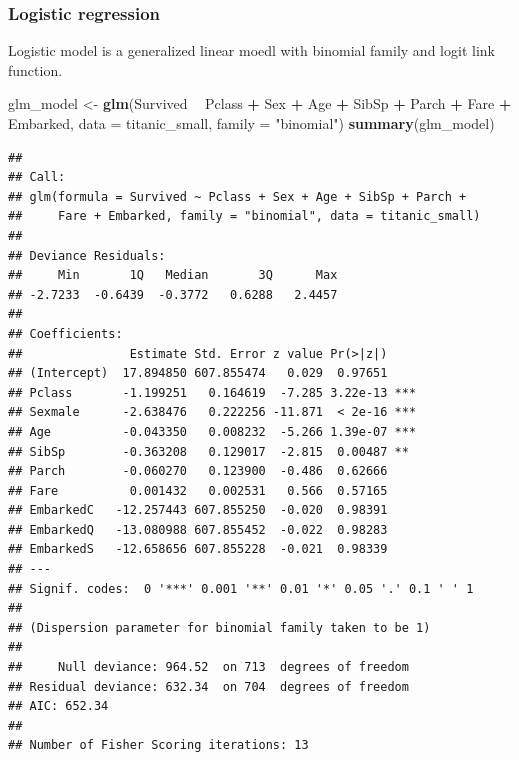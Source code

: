 \documentclass[]{krantz}
\newenvironment{Shaded}{\begin{snugshade}}{\end{snugshade}}
\newcommand{\DataTypeTok}[1]{\textcolor[rgb]{0.13,0.29,0.53}{#1}}
\newcommand{\KeywordTok}[1]{\textcolor[rgb]{0.13,0.29,0.53}{\textbf{#1}}}
\newcommand{\NormalTok}[1]{#1}
\newcommand{\OperatorTok}[1]{\textcolor[rgb]{0.81,0.36,0.00}{\textbf{#1}}}
\newcommand{\StringTok}[1]{\textcolor[rgb]{0.31,0.60,0.02}{#1}}
\theoremstyle{definition}
\theoremstyle{definition}
\theoremstyle{definition}
\theoremstyle{remark}
\begin{document}
\hypertarget{logistic-regression}{%
\subsubsection{Logistic regression}\label{logistic-regression}}

Logistic model is a generalized linear moedl with binomial family and
logit link function.

\begin{Shaded}
\begin{Highlighting}[]
\NormalTok{glm_model <-}\StringTok{ }\KeywordTok{glm}\NormalTok{(Survived }\OperatorTok{~}\StringTok{ }\NormalTok{Pclass }\OperatorTok{+}\StringTok{ }\NormalTok{Sex }\OperatorTok{+}\StringTok{ }\NormalTok{Age }\OperatorTok{+}\StringTok{ }\NormalTok{SibSp }\OperatorTok{+}\StringTok{ }\NormalTok{Parch }\OperatorTok{+}\StringTok{ }\NormalTok{Fare }\OperatorTok{+}\StringTok{ }\NormalTok{Embarked,}
                         \DataTypeTok{data =}\NormalTok{ titanic_small, }\DataTypeTok{family =} \StringTok{"binomial"}\NormalTok{)}
\KeywordTok{summary}\NormalTok{(glm_model)}
\end{Highlighting}
\end{Shaded}

\begin{verbatim}
## 
## Call:
## glm(formula = Survived ~ Pclass + Sex + Age + SibSp + Parch + 
##     Fare + Embarked, family = "binomial", data = titanic_small)
## 
## Deviance Residuals: 
##     Min       1Q   Median       3Q      Max  
## -2.7233  -0.6439  -0.3772   0.6288   2.4457  
## 
## Coefficients:
##               Estimate Std. Error z value Pr(>|z|)    
## (Intercept)  17.894850 607.855474   0.029  0.97651    
## Pclass       -1.199251   0.164619  -7.285 3.22e-13 ***
## Sexmale      -2.638476   0.222256 -11.871  < 2e-16 ***
## Age          -0.043350   0.008232  -5.266 1.39e-07 ***
## SibSp        -0.363208   0.129017  -2.815  0.00487 ** 
## Parch        -0.060270   0.123900  -0.486  0.62666    
## Fare          0.001432   0.002531   0.566  0.57165    
## EmbarkedC   -12.257443 607.855250  -0.020  0.98391    
## EmbarkedQ   -13.080988 607.855452  -0.022  0.98283    
## EmbarkedS   -12.658656 607.855228  -0.021  0.98339    
## ---
## Signif. codes:  0 '***' 0.001 '**' 0.01 '*' 0.05 '.' 0.1 ' ' 1
## 
## (Dispersion parameter for binomial family taken to be 1)
## 
##     Null deviance: 964.52  on 713  degrees of freedom
## Residual deviance: 632.34  on 704  degrees of freedom
## AIC: 652.34
## 
## Number of Fisher Scoring iterations: 13
\end{verbatim}
\end{document}
